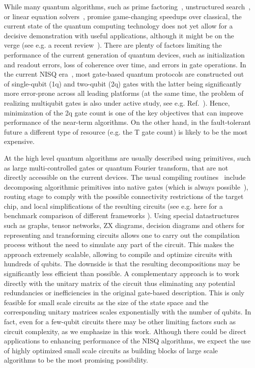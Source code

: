 \documentclass[twocolumn, amsfonts, amssymb, aps, nofootinbib]{revtex4-2}
\newcommand{\T}{\textsf{T }}
\begin{document}
While many quantum algorithms, such as prime factoring~\cite{Shor1997}, unstructured search~\cite{Grover1997}, or linear equation solvers~\cite{Harrow2009}, promise game-changing speedups over classical, the current state of the quantum computing technology does not yet allow for a decisive demonstration with useful applications, although it might be on the verge (see e.g. a recent review~\cite{Fedorov2022}). There are plenty of factors limiting the performance of the current generation of quantum devices, such as initialization and readout errors, loss of coherence over time, and errors in gate operations. In the current NISQ era~\cite{Preskill2018}, most gate-based quantum protocols are constructed out of single-qubit (1q) and two-qubit (2q) gates with the latter being significantly more error-prone across all leading platforms (at the same time, the problem of realizing multiqubit gates is also under active study, see e.g. Ref.~\cite{Khazali2020}). Hence, minimization of the 2q gate count is one of the key objectives that can improve performance of the near-term algorithms. On the other hand, in the fault-tolerant future a different type of resource (e.g. the \T gate count) is likely to be the most expensive.

At the high level quantum algorithms are usually described using primitives, such as large multi-controlled gates or quantum Fourier transform, that are not directly accessible on the current devices. The usual compiling routines~\cite{Qiskit, Sivarajah2021} include decomposing algorithmic primitives into native gates (which is always possible~\cite{Barenco1995}), routing stage to comply with the possible connectivity restrictions of the target chip, and local simplifications of the resulting circuits (see e.g. here for a benchmark comparison of different frameworks \cite{Kharkov2022}). Using special datastructures such as graphs, tensor networks, ZX diagrams, decision diagrams and others for representing and transforming circuits allows one to carry out the compilation process without the need to simulate any part of the circuit. This makes the approach extremely scalable, allowing to compile and optimize circuits with hundreds of qubits. The downside is that the resulting decompositions may be significantly less efficient than possible. A complementary approach is to work directly with the unitary matrix of the circuit thus eliminating any potential redundancies or inefficiencies in the original gate-based description. This is only feasible for small scale circuits as the size of the state space and the corresponding unitary matrices scales exponentially with the number of qubits. In fact, even for a few-qubit circuits there may be other limiting factors such as circuit complexity, as we emphasize in this work. Although there could be direct applications to enhancing performance of the NISQ algorithms, we expect the use of highly optimized small scale circuits as building blocks of large scale algorithms to be the most promising possibility.
\end{document}
